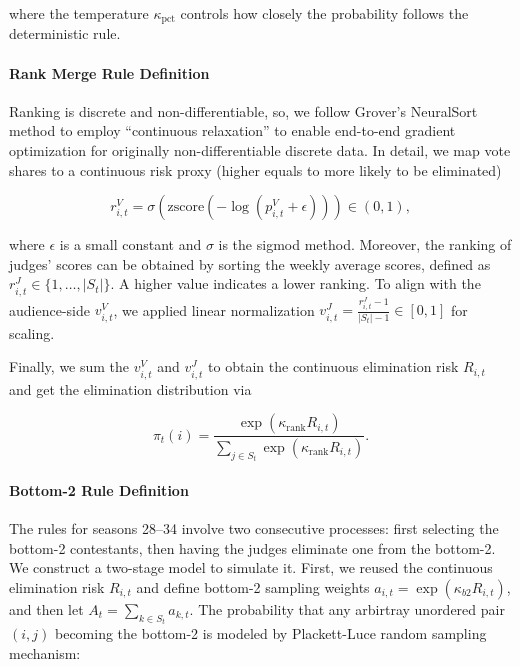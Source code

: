 \documentclass[12pt]{article}
\begin{document}
where the temperature $\kappa_{\text{pct}}$ controls how closely the probability follows the deterministic rule.

\paragraph{Rank Merge Rule Definition}

Ranking is discrete and non-differentiable, so, we follow Grover's NeuralSort method to employ “continuous relaxation” to enable end-to-end gradient optimization for originally non-differentiable discrete data. In detail, we map vote shares to a continuous risk proxy (higher equals to more likely to be eliminated)

$$r_{i,t}^{V} = \sigma\left(\text{zscore}\left( -\log(p_{i,t}^{V} + \epsilon)\right)\right) \in (0, 1),$$

where $\epsilon$ is a small constant and $\sigma$ is the sigmod method. Moreover, the ranking of judges' scores can be obtained by sorting the weekly average scores, defined as $r_{i,t}^J \in \{1, \dots, |S_t|\}$. A higher value indicates a lower ranking. To align with the audience-side $v_{i,t}^V$, we applied linear normalization $v_{i,t}^J = \frac{r_{i,t}^J - 1}{|S_t| - 1} \in [0, 1]$ for scaling.

Finally, we sum the $v_{i,t}^V$ and $v_{i,t}^J$ to obtain the continuous elimination risk $R_{i,t}$ and get the elimination distribution via

\begin{equation}
  \pi_t(i) = \frac{\exp \left( \kappa_{\text{rank}} R_{i,t} \right)}{\sum_{j \in S_t} \exp \left( \kappa_{\text{rank}} R_{i,t} \right)}.
\end{equation}

\paragraph{Bottom-2 Rule Definition}

The rules for seasons 28–34 involve two consecutive processes: first selecting the bottom-2 contestants, then having the judges eliminate one from the bottom-2. We construct a two-stage model to simulate it. First, we reused the continuous elimination risk $R_{i,t}$ and define bottom-2 sampling weights $a_{i,t} = \exp(\kappa_{b2} R_{i,t})$, and then let $A_t = \sum_{k \in S_t} a_{k,t}$. The probability that any arbirtray unordered pair $(i,j)$ becoming the bottom-2 is modeled by Plackett-Luce random sampling mechanism:
\end{document}
